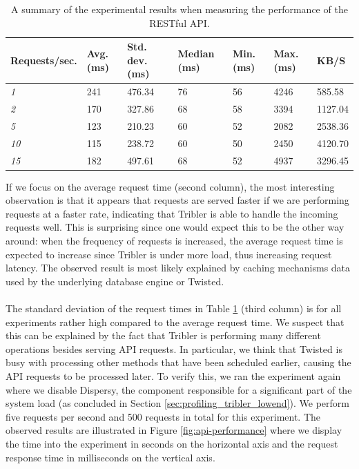 \begin{table}[]
	\centering
	\begin{tabular}{|l|l|l|l|l|l|l|}
		\hline
		\textbf{Requests/sec.} & \textbf{Avg. (ms)} & \textbf{Std. dev. (ms)} & \textbf{Median (ms)} & \textbf{Min. (ms)} & \textbf{Max. (ms)} & \textbf{KB/S} \\ \hline
		\emph{1} & 241 & 476.34 & 76 & 56 & 4246 & 585.58\\ \hline
		\emph{2} & 170 & 327.86 & 68 & 58 & 3394 & 1127.04\\ \hline
		\emph{5} & 123 & 210.23 & 60 & 52 & 2082 & 2538.36\\ \hline
		\emph{10} & 115 & 238.72 & 60 & 50 & 2450 & 4120.70\\ \hline
		\emph{15} & 182 & 497.61 & 68 & 52 & 4937 & 3296.45\\ \hline
	\end{tabular}
	\caption{A summary of the experimental results when measuring the performance of the RESTful API.}
	\label{table:performance-api-results}
\end{table}

If we focus on the average request time (second column), the most interesting observation is that it appears that requests are served faster if we are performing requests at a faster rate, indicating that Tribler is able to handle the incoming requests well. This is surprising since one would expect this to be the other way around: when the frequency of requests is increased, the average request time is expected to increase since Tribler is under more load, thus increasing request latency. The observed result is most likely explained by caching mechanisms data used by the underlying database engine or Twisted.\\\\
The standard deviation of the request times in Table \ref{table:performance-api-results} (third column) is for all experiments rather high compared to the average request time. We suspect that this can be explained by the fact that Tribler is performing many different operations besides serving API requests. In particular, we think that Twisted is busy with processing other methods that have been scheduled earlier, causing the API requests to be processed later. To verify this, we ran the experiment again where we disable Dispersy, the component responsible for a significant part of the system load (as concluded in Section \ref{sec:profiling_tribler_lowend}). We perform five requests per second and 500 requests in total for this experiment. The observed results are illustrated in Figure \ref{fig:api-performance} where we display the time into the experiment in seconds on the horizontal axis and the request response time in milliseconds on the vertical axis.\\

